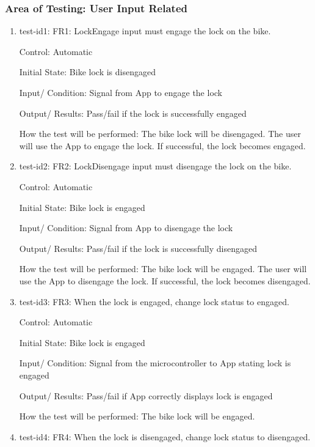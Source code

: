 \documentclass[12pt, titlepage]{article}
\begin{document}
\subsubsection{Area of Testing: User Input Related}

\begin{enumerate}

\item{test-id1: FR1: LockEngage input must engage the lock on the bike. \\} 

Control: Automatic 

Initial State: Bike lock is disengaged 

Input/ Condition: Signal from App to engage the lock 

Output/ Results: Pass/fail if the lock is successfully engaged  

How the test will be performed: The bike lock will be disengaged. The user will use the App to engage the lock. If successful, the lock becomes engaged. 

\item{test-id2: FR2: LockDisengage input must disengage the lock on the bike. \\} 

Control: Automatic 

Initial State: Bike lock is engaged 

Input/ Condition: Signal from App to disengage the lock 

Output/ Results: Pass/fail if the lock is successfully disengaged  

How the test will be performed: The bike lock will be engaged. The user will use the App to disengage the lock. If successful, the lock becomes disengaged. 

\item{test-id3: FR3: When the lock is engaged, change lock status to engaged. \\} 

Control: Automatic 

Initial State: Bike lock is engaged 

Input/ Condition: Signal from the microcontroller to App stating lock is engaged 

Output/ Results: Pass/fail if App correctly displays lock is engaged 

How the test will be performed: The bike lock will be engaged.  

 \item{test-id4: FR4: When the lock is disengaged, change lock status to disengaged. \\} 


\end{enumerate}
\end{document}
